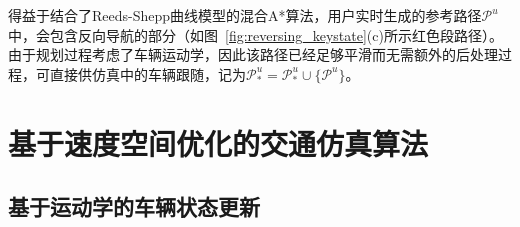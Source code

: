 得益于结合了Reeds-Shepp曲线模型的混合A*算法，用户实时生成的参考路径$\mathcal{P}^{u}$中，会包含反向导航的部分（如图~\ref{fig:reversing_keystate}(c)所示红色段路径）。由于规划过程考虑了车辆运动学，因此该路径已经足够平滑而无需额外的后处理过程，可直接供仿真中的车辆跟随，记为$\mathcal{P}^{u}_{*} = \mathcal{P}^{u}_{*} \cup \{\mathcal{P}^{u}\}$。



\section{基于速度空间优化的交通仿真算法}



\subsection{基于运动学的车辆状态更新}
\label{section:reversing_dynamics}


